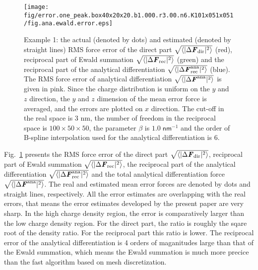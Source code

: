 \documentclass[aps,pre,preprint]{revtex4}
\renewcommand{\v}[1]{\textbf{\textit{#1}}}
\begin{document}
\begin{figure}
  \centering
  \texttt{[image: fig/error.one\_peak.box40x20x20.b1.000.r3.00.n6.K101x051x051/fig.ana.ewald.error.eps]}
  \caption{Example 1: the actual (denoted by dots) and estimated
    (denoted by straight lines) RMS force error of the direct part
    $\sqrt{\langle\vert\Delta \v F_{\textrm{dir}}\vert^2\rangle}$
    (red), reciprocal part of Ewald summation
    $\sqrt{\langle\vert\Delta \v F_{\textrm{rec}}\vert^2\rangle}$
    (green) and the reciprocal part of the analytical differentiation
    $\sqrt{\langle\vert\Delta \v
      F^{\textrm{ana}}_{\textrm{rec}}\vert^2\rangle}$ (blue). The RMS
    force error of analytical differentiation
    $\sqrt{\langle\vert\Delta \v F^{\textrm{ana}}\vert^2\rangle}$ is
    given in pink.  Since the charge distribution is uniform on the
    $y$ and $z$ direction, the $y$ and $z$ dimension of the mean error
    force is averaged, and the errors are plotted on $x$ direction.
    The cut-off in the real space is 3 \textsf{nm}, the number of
    freedom in the reciprocal space is $100\times 50\times 50$, the
    parameter $\beta$ is $1.0\; \textsf{nm}^{-1}$ and the order of
    B-spline interpolation used for the analytical differentiation is
    6.}
  \label{fig:error1}
\end{figure}

Fig.~\ref{fig:error1} presents the RMS force error of the direct part
$\sqrt{\langle\vert\Delta \v F_{\textrm{dir}}\vert^2\rangle}$,
reciprocal part of Ewald summation $\sqrt{\langle\vert\Delta \v
  F_{\textrm{rec}}\vert^2\rangle}$, the reciprocal part of the
analytical differentiation $\sqrt{\langle\vert\Delta \v
  F^{\textrm{ana}}_{\textrm{rec}}\vert^2\rangle}$ and the total
analytical differentiation force $\sqrt{\langle\vert\Delta \v
  F^{\textrm{ana}}\vert^2\rangle}$.  The real and estimated mean error
forces are denoted by dots and straight lines, respectively. All the
error estimates are overlapping with the real errors, that means the
error estimates developed by the present paper are very sharp.
In the high charge density region, the error is comparatively larger
than the low charge density region. For the direct part, the ratio is
roughly the sqare root of the density ratio. For the reciprocal part
this ratio is lower. The reciprocal error of the analytical
differentiation is 4 orders of maganitudes large than that of the
Ewald summation, which means the Ewald summation is much more precice
than the fast algorithm based on mesh discretization.
\end{document}
